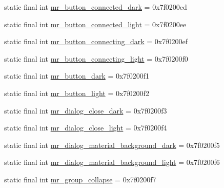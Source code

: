 \begin{CompactItemize}
\item 
static final int \hyperlink{classandroid_1_1support_1_1graphics_1_1drawable_1_1animated_1_1_r_1_1drawable_407d38151c38b65c5489e0f65cb6c0b6}{mr\_\-button\_\-connected\_\-dark} = 0x7f0200ed
\item 
static final int \hyperlink{classandroid_1_1support_1_1graphics_1_1drawable_1_1animated_1_1_r_1_1drawable_617b8ff40f02f0469991f75fec3bdb75}{mr\_\-button\_\-connected\_\-light} = 0x7f0200ee
\item 
static final int \hyperlink{classandroid_1_1support_1_1graphics_1_1drawable_1_1animated_1_1_r_1_1drawable_5d81d34364dd4f3a21b899f47901f0f9}{mr\_\-button\_\-connecting\_\-dark} = 0x7f0200ef
\item 
static final int \hyperlink{classandroid_1_1support_1_1graphics_1_1drawable_1_1animated_1_1_r_1_1drawable_493879b04b2997b7ca452d409d458d55}{mr\_\-button\_\-connecting\_\-light} = 0x7f0200f0
\item 
static final int \hyperlink{classandroid_1_1support_1_1graphics_1_1drawable_1_1animated_1_1_r_1_1drawable_3206a745d49704575a539c3992956f84}{mr\_\-button\_\-dark} = 0x7f0200f1
\item 
static final int \hyperlink{classandroid_1_1support_1_1graphics_1_1drawable_1_1animated_1_1_r_1_1drawable_4049308bc8ec731b6346a16d3dbd04ce}{mr\_\-button\_\-light} = 0x7f0200f2
\item 
static final int \hyperlink{classandroid_1_1support_1_1graphics_1_1drawable_1_1animated_1_1_r_1_1drawable_fa082a194b2e92524c59b412470dd851}{mr\_\-dialog\_\-close\_\-dark} = 0x7f0200f3
\item 
static final int \hyperlink{classandroid_1_1support_1_1graphics_1_1drawable_1_1animated_1_1_r_1_1drawable_a19023c67b01f6ade909d5ab7a04187c}{mr\_\-dialog\_\-close\_\-light} = 0x7f0200f4
\item 
static final int \hyperlink{classandroid_1_1support_1_1graphics_1_1drawable_1_1animated_1_1_r_1_1drawable_92823e8d14adb494399322bb459c6c05}{mr\_\-dialog\_\-material\_\-background\_\-dark} = 0x7f0200f5
\item 
static final int \hyperlink{classandroid_1_1support_1_1graphics_1_1drawable_1_1animated_1_1_r_1_1drawable_08d9732c316abd92430a1160b22e0f7c}{mr\_\-dialog\_\-material\_\-background\_\-light} = 0x7f0200f6
\item 
static final int \hyperlink{classandroid_1_1support_1_1graphics_1_1drawable_1_1animated_1_1_r_1_1drawable_4c75437a1b9b7e9d738f311e63722a4a}{mr\_\-group\_\-collapse} = 0x7f0200f7
\item 

\end{CompactItemize}
